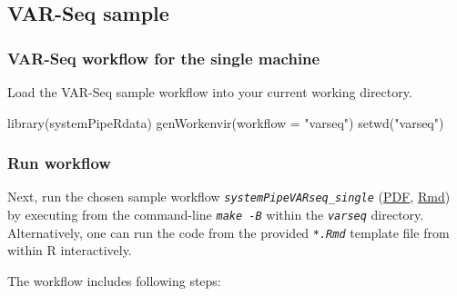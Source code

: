 \documentclass[14pt,]{article}
\newcommand{\hlstr}[1]{\textcolor[rgb]{0.251,0.627,0.251}{#1}}%
\newcommand{\hlstd}[1]{\textcolor[rgb]{0.251,0.251,0.251}{#1}}%
\newenvironment{Shaded}{\begin{myshaded}}{\end{myshaded}}
\newcommand{\StringTok}[1]{\hlstr{#1}}
\newcommand{\FunctionTok}[1]{\hlstd{#1}}
\newcommand{\AttributeTok}[1]{{#1}}
\newcommand{\NormalTok}[1]{\hlstd{#1}}
\begin{document}
\hypertarget{var-seq-sample}{%
\subsection{VAR-Seq sample}\label{var-seq-sample}}

\hypertarget{var-seq-workflow-for-the-single-machine}{%
\subsubsection{VAR-Seq workflow for the single machine}\label{var-seq-workflow-for-the-single-machine}}

Load the VAR-Seq sample workflow into your current working directory.

\begin{Shaded}
\begin{Highlighting}[]
\FunctionTok{library}\NormalTok{(systemPipeRdata)}
\FunctionTok{genWorkenvir}\NormalTok{(}\AttributeTok{workflow =} \StringTok{"varseq"}\NormalTok{)}
\FunctionTok{setwd}\NormalTok{(}\StringTok{"varseq"}\NormalTok{)}
\end{Highlighting}
\end{Shaded}

\hypertarget{run-workflow-2}{%
\subsubsection{Run workflow}\label{run-workflow-2}}

Next, run the chosen sample workflow \emph{\texttt{systemPipeVARseq\_single}} (\href{https://github.com/tgirke/systemPipeRdata/blob/master/inst/extdata/workflows/varseq/systemPipeVARseq_single.pdf?raw=true}{PDF}, \href{https://github.com/tgirke/systemPipeRdata/blob/master/inst/extdata/workflows/varseq/systemPipeVARseq_single.Rmd}{Rmd}) by executing from the command-line \emph{\texttt{make -B}} within the \emph{\texttt{varseq}} directory. Alternatively, one can run the code from the provided \emph{\texttt{*.Rmd}} template file from within R interactively.

The workflow includes following steps:
\end{document}
